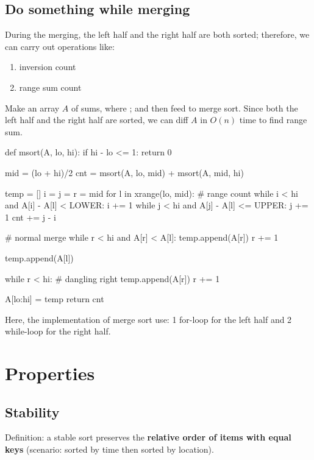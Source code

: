 \subsection{Do something while merging}
During the merging, the left half and the right half are both sorted; therefore, we can carry out operations like:
\begin{enumerate}
\item inversion count 
\item range sum count 
\end{enumerate}

 Make an array $A$ of sums, where ; and then feed to merge sort. Since both the left half and the right half are sorted, we can diff $A$ in $O(n)$ time to find range sum. 

\begin{python}
def msort(A, lo, hi):
  if hi - lo <= 1: return 0

  mid = (lo + hi)/2
  cnt = msort(A, lo, mid) + msort(A, mid, hi)

  temp = []
  i = j = r = mid
  for l in xrange(lo, mid):
    # range count
    while i < hi and A[i] - A[l] <  LOWER: i += 1
    while j < hi and A[j] - A[l] <= UPPER: j += 1
    cnt += j - i

    # normal merge 
    while r < hi and A[r] < A[l]:
      temp.append(A[r])
      r += 1

    temp.append(A[l])

  while r < hi:  # dangling right
    temp.append(A[r])
    r += 1

  A[lo:hi] = temp
  return cnt
\end{python}

Here, the implementation of merge sort use: 1 for-loop for the left half and 2 while-loop for the right half.

\section{Properties}
\subsection{Stability}
Definition: a stable sort preserves the \textbf{relative order of items with equal keys} (scenario: sorted by time then sorted by location). 


